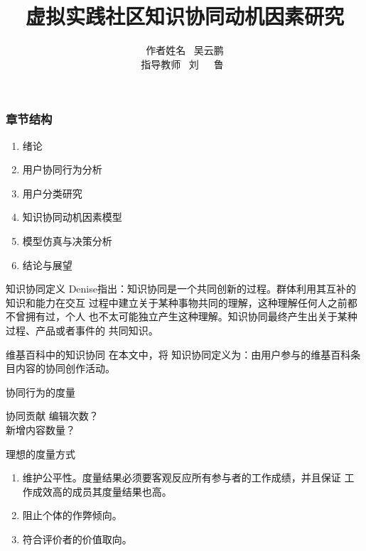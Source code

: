 \documentclass[slidestop,compress,mathserif,table]{beamer}
\begin{document}
\title{ 虚拟实践社区知识协同动机因素研究 \vspace{1.5cm}}
    \author{作者姓名 \ 吴云鹏 \\指导教师  \ 刘\ \ \ 鲁\ }
    \begin{frame}
      \titlepage
    \end{frame}

    \begin{frame}
      \frametitle{章节结构}
      \begin{enumerate}
      \item 绪论
       \item 用户协同行为分析
         \item 用户分类研究
           \item 知识协同动机因素模型
\item 模型仿真与决策分析
\item 结论与展望
      \end{enumerate}
    \end{frame}

    \begin{frame}
       \begin{block}{知识协同定义}
   Denise指出：知识协同是一个共同创新的过程。群体利用其互补的知识和能力在交互
过程中建立关于某种事物共同的理解，这种理解任何人之前都不曾拥有过，个人
也不太可能独立产生这种理解。知识协同最终产生出关于某种过程、产品或者事件的
共同知识。
     \end{block}
\pause
\vfill
\begin{block}{维基百科中的知识协同}
在本文中，将
知识协同定义为：由用户参与的维基百科条目内容的协同创作活动。
  
\end{block}
    \end{frame}

    \begin{frame}{协同行为的度量}
      \begin{block}{协同贡献}
        编辑次数？\\
        新增内容数量？
      \end{block}

  \pause \vfill
  \begin{block}{理想的度量方式}
    \begin{enumerate}
     \item 维护公平性。度量结果必须要客观反应所有参与者的工作成绩，并且保证
  工作成效高的成员其度量结果也高。
\item 阻止个体的作弊倾向。
\item 符合评价者的价值取向。
    \end{enumerate}
     
\end{block}
    \end{frame}
    
\end{document}
